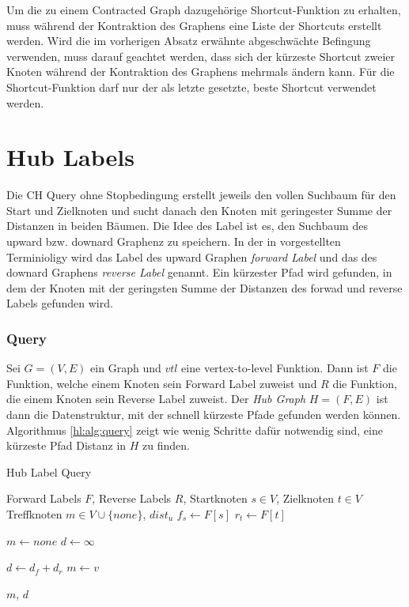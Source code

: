 Um die zu einem Contracted Graph dazugehörige Shortcut-Funktion zu erhalten, muss während der Kontraktion des Graphens eine Liste der Shortcuts erstellt werden.
Wird die im vorherigen Absatz erwähnte abgeschwächte Befingung verwenden, muss darauf geachtet werden, dass sich der kürzeste Shortcut zweier Knoten während der Kontraktion des Graphens mehrmals ändern kann.
Für die Shortcut-Funktion darf nur der als letzte gesetzte, beste Shortcut verwendet werden.

\section{Hub Labels}\label{chapter:hl}

Die CH Query ohne Stopbedingung erstellt jeweils den vollen Suchbaum für den Start und Zielknoten und sucht danach den Knoten mit geringester Summe der Distanzen in beiden Bäumen.
Die Idee des Label ist es, den Suchbaum des upward bzw. downard Graphenz zu speichern.
In der in \cite{abraham2011hub} vorgestellten Terminioligy wird das Label des upward Graphen \emph{forward Label} und das des downard Graphens \emph{reverse Label} genannt.
Ein kürzester Pfad wird gefunden, in dem der Knoten mit der geringsten Summe der Distanzen des forwad und reverse Labels gefunden wird.


\subsubsection{Query}

Sei $G = (V, E)$ ein Graph und ${vtl}$ eine vertex-to-level Funktion.
Dann ist $F$ die Funktion, welche einem Knoten sein Forward Label zuweist und $R$ die Funktion, die einem Knoten sein Reverse Label zuweist.
Der \emph{Hub Graph} $H = (F, E)$ ist dann die Datenstruktur, mit der schnell kürzeste Pfade gefunden werden können.
Algorithmus \ref{hl:alg:query} zeigt wie wenig Schritte dafür notwendig sind, eine kürzeste Pfad Distanz in $H$ zu finden.

\begin{algorithm}[ht]
    \caption{Hub Label Query}
    \begin{algorithmic}[1]
        \Require Forward Labels $F$, Reverse Labels $R$, Startknoten $s \in V$, Zielknoten $t \in V$
        \Ensure Treffknoten $m \in V \cup \{ {none} \}$, ${dist}_u$
        \State $f_s \leftarrow F[s]$
        \State $r_t \leftarrow F[t]$

        \State
        \State $m \leftarrow {none}$
        \State $d \leftarrow \infty$

        \State $d \leftarrow d_f + d_r$
        \State $m \leftarrow v$
        \EndIf
        \EndFor

        \State
        \State \Return $m$, $d$
    \end{algorithmic}
    \label{hl:alg:query}
\end{algorithm}

